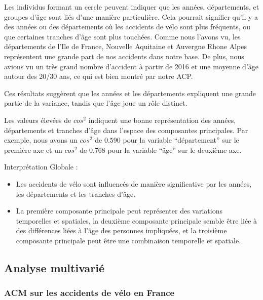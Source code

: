 \documentclass[french,]{compterendu}
\providecommand{\tightlist}{%
  \setlength{\itemsep}{0pt}\setlength{\parskip}{0pt}}
\theoremstyle{urcastyle}
\theoremstyle{remark}
\begin{document}
Les individus formant un cercle peuvent indiquer que les années, départements, et groupes d'âge sont liés d'une manière particulière. Cela pourrait signifier qu'il y a des années ou des départements où les accidents de vélo sont plus fréquents, ou que certaines tranches d'âge sont plus touchées. Comme nous l'avons vu, les départements de l'Ile de France, Nouvelle Aquitaine et Auvergne Rhone Alpes représentent une grande part de nos accidents dans notre base. De plus, nous avions vu un très grand nombre d'accident à partir de 2016 et une moyenne d'âge autour des 20/30 ans, ce qui est bien montré par notre ACP.

Ces résultats suggèrent que les années et les départements expliquent une grande partie de la variance, tandis que l'âge joue un rôle distinct.

Les valeurs élevées de \(cos^2\) indiquent une bonne représentation des années, départements et tranches d'âge dans l'espace des composantes principales. Par exemple, nous avons un \(cos^2\) de \(0.590\) pour la variable ``département'' sur le première axe et un \(cos^2\) de \(0.768\) pour la variable ``âge'' sur le deuxième axe.

Interprétation Globale :

\begin{itemize}
\tightlist
\item
  Les accidents de vélo sont influencés de manière significative par les années, les départements et les tranches d'âge.
\item
  La première composante principale peut représenter des variations temporelles et spatiales, la deuxième composante principale semble être liée à des différences liées à l'âge des personnes impliquées, et la troisième composante principale peut être une combinaison temporelle et spatiale.
\end{itemize}

\hypertarget{analyse-multivariuxe9}{%
\subsection{Analyse multivarié}\label{analyse-multivariuxe9}}

\hypertarget{acm-sur-les-accidents-de-vuxe9lo-en-france}{%
\subsubsection{ACM sur les accidents de vélo en France}\label{acm-sur-les-accidents-de-vuxe9lo-en-france}}
\end{document}
